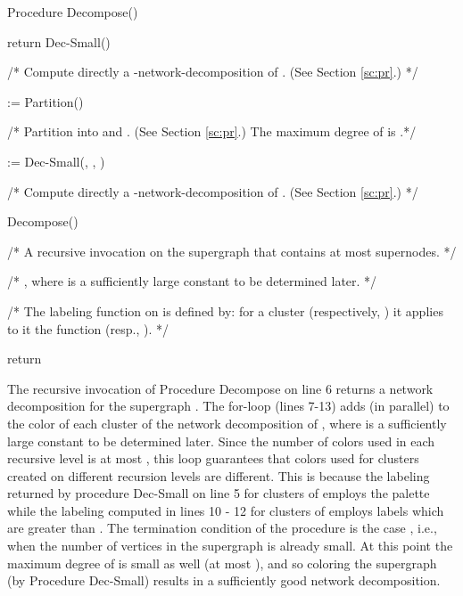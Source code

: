 \documentclass[11pt]{article}
\begin{document}
\begin{algorithm}[H]
\caption{Procedure Decompose()}
\label{proced:decompose}

\begin{algorithmic}[1] 

\IF {}

    \STATE return Dec-Small() 
 
    /* Compute directly a -network-decomposition of . (See Section \ref{sc:pr}.) */

\ELSE

    \STATE  := Partition()
				
		/* Partition  into  and . (See Section \ref{sc:pr}.) The maximum degree of  is .*/
		
		\STATE  := Dec-Small(, , )
		
		/* Compute directly a -network-decomposition of . (See Section \ref{sc:pr}.) */
		
	  \STATE  Decompose()
		
		/* A recursive invocation on the supergraph  that contains at most  supernodes.  */
		
		
		    \IF {}
				   
					\STATE 
				
				\ELSIF {}
		
		    \STATE  
				
				/* , where  is a sufficiently large constant to be determined later. */
				
				\ENDIF
				
		/* The labeling function  on  is defined by: for a cluster  (respectively, ) it applies to it the function  (resp., ). */		
				
		\ENDFOR
		
		\STATE return 
		
\ENDIF

\end{algorithmic}
\end{algorithm}


The recursive invocation of Procedure Decompose on line 6 returns a network decomposition  for the supergraph . The for-loop (lines 7-13) adds (in parallel)  to the color of each cluster of the network decomposition  of , where  is a sufficiently large constant to be determined later. Since the number of colors used in each recursive level is at most , this loop guarantees that colors used for clusters created on different recursion levels are different. This is because the labeling returned by procedure Dec-Small on line 5 for clusters of  employs the palette  while the labeling computed in lines 10 - 12 for clusters of  employs labels which are greater than .
The termination condition of the procedure is the case , i.e., when the number  of vertices in the supergraph  is already small. At this point the maximum degree of  is small as well (at most ), and so coloring the supergraph (by Procedure Dec-Small) results in a sufficiently good network decomposition.
\end{document}
